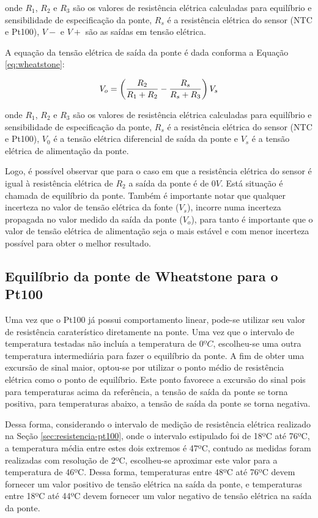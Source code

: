 \documentclass[a4paper]{instrumentacao}
\begin{document}
\noindent onde $R_1$, $R_2$ e $R_3$ são os valores de resistência elétrica calculadas para equilíbrio e sensibilidade de especificação da ponte, $R_s$ é a resistência elétrica do sensor (NTC e Pt100), $V-$ e $V+$ são as saídas em tensão elétrica.

A equação da tensão elétrica de saída da ponte é dada conforma a Equação \ref{eq:wheatstone}:

\begin{equation}
	V_o = \left({{R_2}\over{R_1 + R_2}} - {{R_s}\over{R_s + R_3}}\right)V_s
	\label{eq:wheatstone}
\end{equation}

\noindent onde $R_1$, $R_2$ e $R_3$ são os valores de resistência elétrica calculadas para equilíbrio e sensibilidade de especificação da ponte, $R_s$ é a resistência elétrica do sensor (NTC e Pt100), $V_0$ é a tensão elétrica diferencial de saída da ponte e $V_s$ é a tensão elétrica de alimentação da ponte.

Logo, é possível observar que para o caso em que a resistência elétrica do sensor é igual à resistência elétrica de $R_2$ a saída da ponte é de $0V$. Está situação é chamada de equilíbrio da ponte. Também é importante notar que qualquer incerteza no valor de tensão elétrica da fonte ($V_s$), incorre numa incerteza propagada no valor medido da saída da ponte ($V_o$), para tanto é importante que o valor de tensão elétrica de alimentação seja o mais estável e com menor incerteza possível para obter o melhor resultado.

\subsection{Equilíbrio da ponte de Wheatstone para o Pt100}
\label{ssec:equilibrio-ponte-pt100}
Uma vez que o Pt100 já possui comportamento linear, pode-se utilizar seu valor de resistência caraterístico diretamente na ponte. Uma vez que o intervalo de temperatura testadas não incluía a temperatura de $0ºC$, escolheu-se uma outra temperatura intermediária para fazer o equilíbrio da ponte. A fim de obter uma excursão de sinal maior, optou-se por utilizar o ponto médio de resistência elétrica como o ponto de equilíbrio. Este ponto favorece a excursão do sinal pois para temperaturas acima da referência, a tensão de saída da ponte se torna positiva, para temperaturas abaixo, a tensão de saída da ponte se torna negativa.

Dessa forma, considerando o intervalo de medição de resistência elétrica realizado na Seção \ref{sec:resistencia-pt100}, onde o intervalo estipulado foi de 18ºC até 76ºC, a temperatura média entre estes dois extremos é 47ºC, contudo as medidas foram realizadas com resolução de 2ºC, escolheu-se aproximar este valor para a temperatura de 46ºC. Dessa forma, temperaturas entre 48ºC até 76ºC devem fornecer um valor positivo de tensão elétrica na saída da ponte, e temperaturas entre 18ºC até 44ºC devem fornecer um valor negativo de tensão elétrica na saída da ponte.
\end{document}
